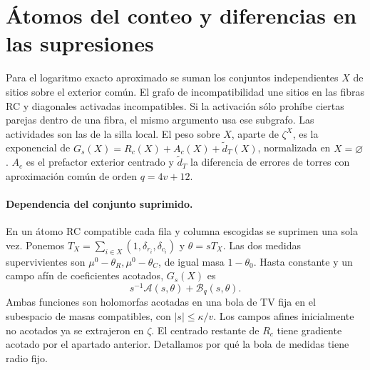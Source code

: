 \section{Átomos del conteo y diferencias en las supresiones}
Para el logaritmo exacto aproximado se suman los conjuntos independientes $X$ de sitios
sobre el exterior común. El grafo de incompatibilidad une sitios en las fibras RC y
diagonales activadas incompatibles. Si la activación sólo prohíbe ciertas parejas
dentro de una fibra, el mismo argumento usa ese subgrafo. Las actividades son las de
la silla local. El peso sobre $X$, aparte de $\zeta^X$, es la exponencial de
$G_s(X)=R_c(X)+A_c(X)+\widetilde d_T(X)$, normalizada en $X=\varnothing$.
$A_c$ es el prefactor exterior centrado y $\widetilde d_T$ la diferencia de errores
de torres con aproximación común de orden $q=4v+12$.
\paragraph{Dependencia del conjunto suprimido.}
En un átomo RC compatible cada fila y columna escogidas se suprimen una sola vez.
Ponemos $T_X=\sum_{i\in X}(1,\delta_{r_i},\delta_{c_i})$ y $\theta=sT_X$.
Las dos medidas supervivientes son $\mu^0-\theta_R,\mu^0-\theta_C$, de igual masa
$1-\theta_0$. Hasta constante y un campo afín de coeficientes acotados, $G_s(X)$ es
\[
       s^{-1}\mathscr A(s,\theta)+\mathscr B_q(s,\theta).
\]
Ambas funciones son holomorfas acotadas en una bola de TV fija en el subespacio de
masas compatibles, con $|s|\le\kappa/v$. Los campos afines inicialmente no acotados
ya se extrajeron en $\zeta$. El centrado restante de $R_c$ tiene gradiente acotado
por el apartado anterior. Detallamos por qué la bola de medidas tiene radio fijo.
